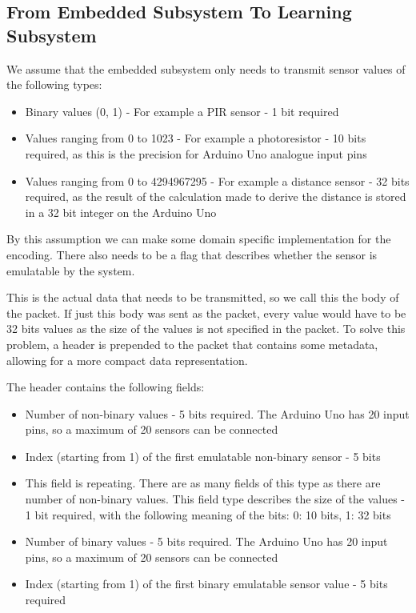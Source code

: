 \subsection{From Embedded Subsystem To Learning Subsystem}
We assume that the embedded subsystem only needs to transmit sensor values of the following types:

\begin{itemize}
\item Binary values (0, 1) - For example a PIR sensor - 1 bit required
\item Values ranging from 0 to 1023 - For example a photoresistor - 10 bits required, as this is the precision for Arduino Uno analogue input pins
\item Values ranging from 0 to 4294967295 - For example a distance sensor - 32 bits required, as the result of the calculation made to derive the distance is stored in a 32 bit integer on the Arduino Uno
\end{itemize}
By this assumption we can make some domain specific implementation for the encoding.
There also needs to be a flag that describes whether the sensor is emulatable by the system.

This is the actual data that needs to be transmitted, so we call this the body of the packet. If just this body was sent as the packet, every value would have to be 32 bits values as the size of the values is not specified in the packet. To solve this problem, a header is prepended to the packet that contains some metadata, allowing for a more compact data representation.

The header contains the following fields:

\begin{itemize}
\item Number of non-binary values - 5 bits required. The Arduino Uno has 20 input pins, so a maximum of 20 sensors can be connected
\item Index (starting from 1) of the first emulatable non-binary sensor - 5 bits
\item This field is repeating. There are as many fields of this type   as there are number of non-binary values. This field type describes
the size of the values - 1 bit required, with the following meaning of the bits: 0: 10 bits, 1: 32 bits
\item Number of binary values - 5 bits required. The Arduino Uno has 20 input pins, so a maximum of 20 sensors can be connected
\item Index (starting from 1) of the first binary emulatable sensor value - 5 bits required
\end{itemize}

